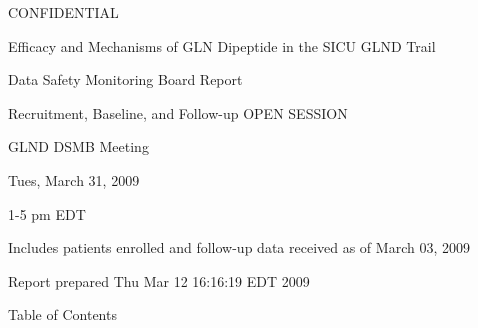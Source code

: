 \documentclass[dvips,10pt]{article}
\begin{document}
\vspace*{1in}
\begin{center}
{\Huge{CONFIDENTIAL}}
\end{center}
\vspace*{0.5in}
\begin{center}
{\Huge{Efficacy and Mechanisms of GLN Dipeptide in the SICU GLND Trail}}
\end{center}
\vspace*{0.5in}
\begin{center}
{\Huge{Data Safety Monitoring Board Report}}
\end{center}
\vspace*{0.25in}
\begin{center}
{\Huge{
Recruitment, Baseline, and Follow-up  OPEN SESSION
}}
\end{center}
\vspace*{1in}
\begin{center}
{\Huge{GLND DSMB Meeting}}
\end{center}
\begin{center}
{\Huge{
 Tues, March 31, 2009
}}
\end{center}
\begin{center}
{\Huge{1-5 pm EDT}}
\end{center}
\vspace*{1in}
\begin{center}
\noindent
{\Large{Includes patients enrolled and follow-up data received as of March 03, 2009}}
\end{center}
\vspace*{0.5in}
\begin{center}
{\Large{Report prepared  Thu Mar 12 16:16:19 EDT 2009 }}
\end{center}
\clearpage
\vspace*{1in}
\begin{center}
{\Huge{Table of Contents}}
\end{center}
\listoftables
\listoffigures
\clearpage
\end{document}
